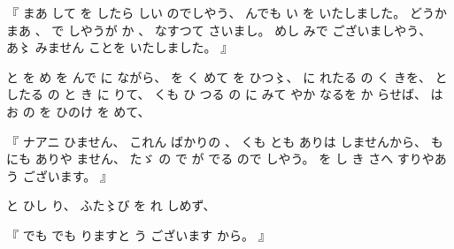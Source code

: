%
『
まあ
して
を
したら
しい
のでしやう、
%
んでも
い
を
いたしました。
%
どうか
まあ
、
%
で
しやうが
か
、
%
なすつて
さいまし。
%
めし
みで
ございましやう、
%
あ〻%
みません
ことを
いたしました。
』

%
と
を
め
を
んで
に%
ながら、
%
を
く
めて%
を
ひつ〻、%
%
に
れたる
の
く
きを、
%
と
したる
の
と
き
に
りて、
%
くも
ひ
つる
の
に
みて
やか
なるを
か
らせば、
%
は
お
の
を
ひのけ
を
めて、%

%
『
ナアニ
ひません、
%
これん
ばかりの
、
%
くも
とも
ありは
しませんから、
%
も%
にも
ありや
ません、
%
たゞ%
の
で
が
でる
ので
しやう。
%
を
し
き%
さへ
すりやあ
う
ございます。
』

%
と
ひし
り、
%
ふた〻び%
を
れ
しめず、

%
『
でも
でも
りますと
う
ございます
から。
』

